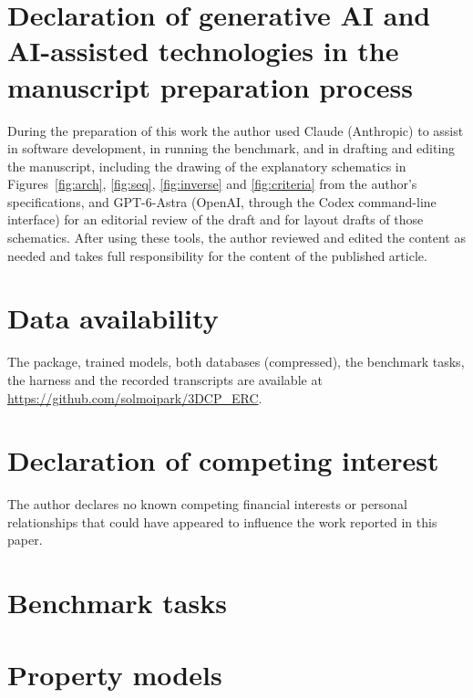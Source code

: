 \documentclass[preprint,12pt]{elsarticle}
\begin{document}
\section*{Declaration of generative AI and AI-assisted technologies in the manuscript preparation process}
During the preparation of this work the author used Claude (Anthropic) to assist in software development, in running the benchmark, and in drafting and editing the manuscript, including the drawing of the explanatory schematics in Figures~\ref{fig:arch}, \ref{fig:seq}, \ref{fig:inverse} and \ref{fig:criteria} from the author's specifications, and GPT-6-Astra (OpenAI, through the Codex command-line interface) for an editorial review of the draft and for layout drafts of those schematics. After using these tools, the author reviewed and edited the content as needed and takes full responsibility for the content of the published article.

\section*{Data availability}
The package, trained models, both databases (compressed), the benchmark tasks, the harness and the recorded transcripts are available at \url{https://github.com/solmoipark/3DCP_ERC}.

\section*{Declaration of competing interest}
The author declares no known competing financial interests or personal relationships that could have appeared to influence the work reported in this paper.




\appendix
\section{Benchmark tasks}
\begin{table}[h]
\centering\scriptsize
\caption{Benchmark tasks with abridged prompts. Full prompts, checks and ground-truth values are provided in the released evaluation package. The checks column counts assertions on recorded tool arguments and identifies additional criteria.}
\resizebox{\textwidth}{!}{}
\end{table}

\section{Property models}
\begin{table}[h]
\centering\scriptsize
\caption{All property models with paper-grouped cross-validation quality ($R^2$ in log space, Spearman rank correlation, 80\,\% interval coverage) and training size.}
\resizebox{\textwidth}{!}{}
\end{table}
\end{document}
